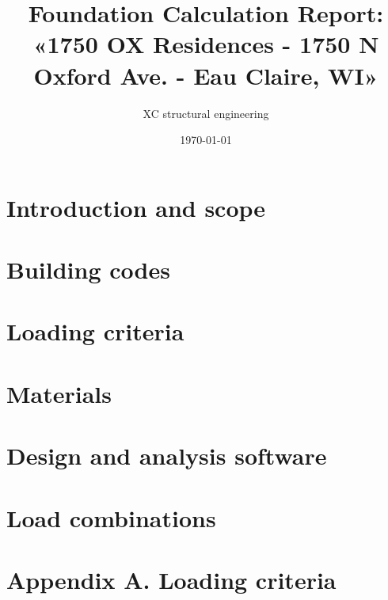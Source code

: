 

\usepackage{array, boldline, makecell, booktabs}
\newcommand\btrule[1]{\specialrule{#1}{0pt}{0pt}}
\usepackage{colortbl}
\usepackage{multicol,caption}               %
\usepackage{xcolor}
\usepackage{hyperref}
\newenvironment{Figure}
  {\par\medskip\noindent\minipage{\linewidth}}
  {\endminipage\par\medskip}

\title{Foundation Calculation Report: «1750 OX Residences - 1750 N Oxford Ave. - Eau Claire, WI» }
\author{XC structural engineering}
\date{\today}
\newcommand{\revision}{0.0}
\newcommand{\titdocum}{Foundation Calculation Report}

\maketitle
\tableofcontents
\listoftables
\listoffigures
\section{Introduction and scope}

\section{Building codes}

\section{Loading criteria}

\section{Materials}

\section{Design and analysis software}

\section{Load combinations}



\clearpage
\appendix
\section{Appendix A. Loading criteria}


